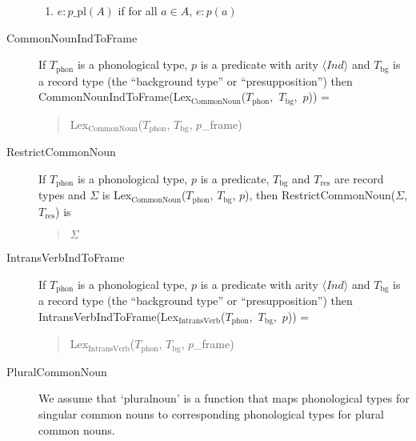 \begin{description}
\begin{enumerate}
\item $e:p\_\text{pl}(A)$ if for all $a\in A$, $e:p(a)$ 
 
\end{enumerate} 
  

\item[\textnormal{CommonNounIndToFrame}] \mbox{}

  If $T_{\mathrm{phon}}$ is a phonological type, $p$ is a predicate with
arity $\langle\textit{Ind}\rangle$ and
$T_\mathrm{bg}$ is a record type (the ``background type'' or
``presupposition'') then \\ 
\mbox{CommonNounIndToFrame(Lex$_{\mathrm{CommonNoun}}$($T_{\mathrm{phon}}$,
  $T_\mathrm{bg}$, $p$))} =
\begin{quote}
  Lex$_{\mathrm{CommonNoun}}$($T_{\mathrm{phon}}$,
  $T_\mathrm{bg}$, $p$\_frame)
\end{quote}

\item[\textnormal{RestrictCommonNoun}] \mbox{}

  If $T_{\mathrm{phon}}$ is a phonological type, $p$ is a predicate,
$T_{\mathrm{bg}}$ and $T_{\mathrm{res}}$ are record types and $\Sigma$
is Lex$_{\mathrm{CommonNoun}}$($T_{\mathrm{phon}}$, $T_{\mathrm{bg}}$,
$p$), then RestrictCommonNoun($\Sigma$, $T_{\mathrm{res}}$) is
\begin{quote}
$\Sigma$
\fbox{\d{$\wedge$}} 
\end{quote}

\item[\textnormal{IntransVerbIndToFrame}] \mbox{}

  If $T_{\mathrm{phon}}$ is a phonological type, $p$ is a predicate with
arity $\langle\textit{Ind}\rangle$ and
$T_\mathrm{bg}$ is a record type (the ``background type'' or
``presupposition'') then \\ 
\mbox{IntransVerbIndToFrame(Lex$_{\mathrm{IntransVerb}}$($T_{\mathrm{phon}}$,
  $T_\mathrm{bg}$, $p$))} =
\begin{quote}
  Lex$_{\mathrm{IntransVerb}}$($T_{\mathrm{phon}}$,
  $T_\mathrm{bg}$, $p$\_frame)
\end{quote}

\item[\textnormal{PluralCommonNoun}] \mbox{}

  We assume that `pluralnoun' is a function that maps phonological
  types for singular common nouns to corresponding phonological types
  for plural common nouns.


\end{description}
